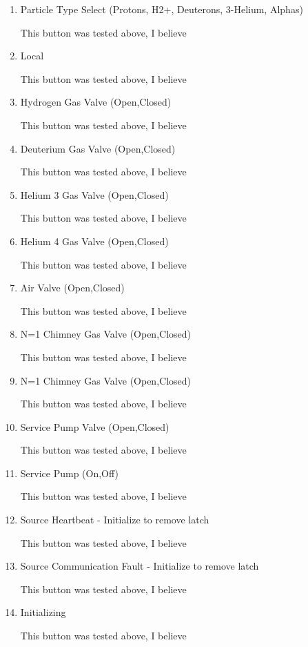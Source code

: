 \documentclass[11pt]{book}		%
\begin{document}
\begin{enumerate}
 \item Particle Type Select (Protons, H2+, Deuterons, 3-Helium, Alphas)

\color{red}
This button was tested above, I believe
\color{black}

 \item Local

\color{red}
This button was tested above, I believe
\color{black}

 \item Hydrogen Gas Valve (Open,Closed)

\color{red}
This button was tested above, I believe
\color{black}

 \item Deuterium Gas Valve (Open,Closed)

\color{red}
This button was tested above, I believe
\color{black}

 \item Helium 3 Gas Valve (Open,Closed)

\color{red}
This button was tested above, I believe
\color{black}

 \item Helium 4 Gas Valve (Open,Closed)

\color{red}
This button was tested above, I believe
\color{black}

 \item Air Valve (Open,Closed)

\color{red}
This button was tested above, I believe
\color{black}

 \item N=1 Chimney Gas Valve (Open,Closed)

\color{red}
This button was tested above, I believe
\color{black}

 \item N=1 Chimney Gas Valve (Open,Closed)

\color{red}
This button was tested above, I believe
\color{black}

 \item Service Pump Valve (Open,Closed)

\color{red}
This button was tested above, I believe
\color{black}

 \item Service Pump (On,Off)

\color{red}
This button was tested above, I believe
\color{black}

 \item Source Heartbeat - Initialize to remove latch

\color{red}
This button was tested above, I believe
\color{black}

 \item Source Communication Fault - Initialize to remove latch

\color{red}
This button was tested above, I believe
\color{black}

 \item Initializing

\color{red}
This button was tested above, I believe
\color{black}

\end{enumerate}
\end{document}
